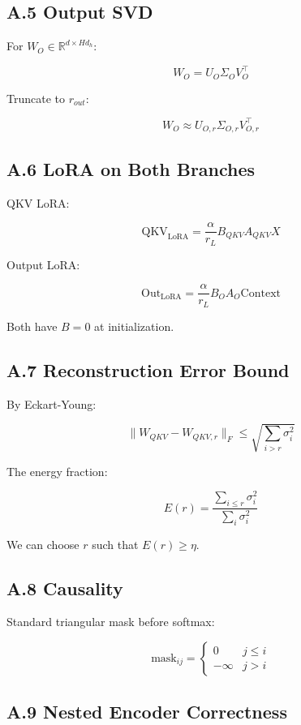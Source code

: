 \subsection{A.5 Output SVD}

For $W_O \in \mathbb{R}^{d \times H d_h}$:

\[
W_O = U_O \Sigma_O V_O^\top
\]

Truncate to $r_{out}$:

\[
W_O \approx U_{O, r} \Sigma_{O, r} V_{O, r}^\top
\]

\subsection{A.6 LoRA on Both Branches}

QKV LoRA:

\[
\text{QKV}_\text{LoRA} = \frac{\alpha}{r_L} B_{QKV} A_{QKV} X
\]

Output LoRA:

\[
\text{Out}_\text{LoRA} = \frac{\alpha}{r_L} B_O A_O \text{Context}
\]

Both have $B = 0$ at initialization.

\subsection{A.7 Reconstruction Error Bound}

By Eckart-Young:

\[
\|W_{QKV} - W_{QKV, r}\|_F \leq \sqrt{\sum_{i > r} \sigma_i^2}
\]

The energy fraction:

\[
E(r) = \frac{\sum_{i \leq r} \sigma_i^2}{\sum_i \sigma_i^2}
\]

We can choose $r$ such that $E(r) \geq \eta$.

\subsection{A.8 Causality}

Standard triangular mask before softmax:

\[
\text{mask}_{ij} = \begin{cases} 0 & j \leq i \\ -\infty & j > i \end{cases}
\]

\subsection{A.9 Nested Encoder Correctness}

